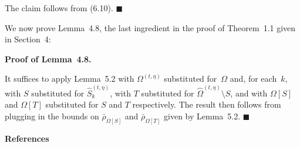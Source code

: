 \documentclass[10pt,a4paper]{article}
\begin{document}
The claim follows from (6.10).
\ensuremath{\blacksquare}\par





We now prove Lemma 4.8, the last ingredient in the proof of Theorem 1.1 given in Section 4:\par




\par\medskip\noindent\textbf{Proof of Lemma 4.8.}\par



It suffices to apply Lemma 5.2 with $\Omega^{(t,\eta)}$ substituted for $\Omega$ and, for each $k$, with $S$ substituted for $\hat{S}_{k}^{(t,\eta)}$, with $T$ substituted for $\hat{\Omega}^{(t,\eta)}\setminus S$, and with $\Omega[S]$ and $\Omega[T]$ substituted for $S$ and $T$ respectively. The result then follows from plugging in the bounds on $\bar{\rho}_{\Omega[S]}$ and $\bar{\rho}_{\Omega[T]}$ given by Lemma 5.2.
\ensuremath{\blacksquare}\par






\par\medskip\noindent\textbf{References}\par
\end{document}

